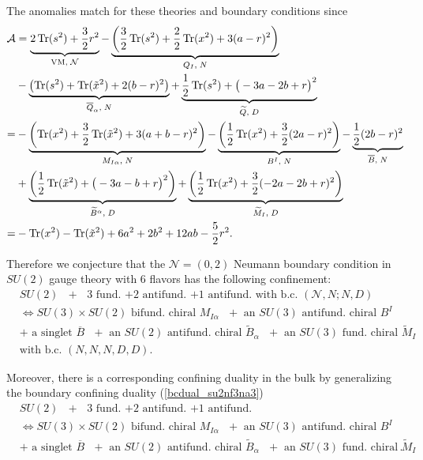 \documentclass[12pt]{article}
\newcommand{\Acal}{\mathcal{A}}
\newcommand{\Ncal}{\mathcal{N}}
\DeclareMathOperator*{\Tr}{{\rm Tr}}
\numberwithin{equation}{section}
\begin{document}
The anomalies match for these theories and boundary conditions since
\begin{align}
\label{bdy_SU2_3_3_anom}
\Acal & = \underbrace{2\Tr(s^2) + \frac{3}{2}r^2}_{\textrm{VM}, \; \Ncal}
 - \underbrace{\left( \frac{3}{2} \Tr(s^2) + \frac{2}{2} \Tr(x^2) + 3(a-r)^2 \right)}_{Q_I, \; N}
  \nonumber \\
 & - \underbrace{\left( \Tr(s^2) + \Tr(\tilde{x}^2) + 2(b-r)^2 \right)}_{\overline{Q}_{\alpha}, \; N}
 + \underbrace{\frac{1}{2} \Tr(s^2) + \big( -3a-2b+r \big)^2}_{\widetilde{Q}, \; D}
  \nonumber \\
  = & - \underbrace{\left( \Tr(x^2) + \frac{3}{2} \Tr(\tilde{x}^2) + 3(a+b-r)^2 \right)}_{M_{I \alpha}, \; N}
   - \underbrace{\left( \frac{1}{2} \Tr(x^2) + \frac{3}{2}(2a-r)^2 \right)}_{B^I, \; N}
   - \underbrace{\frac{1}{2}(2b-r)^2}_{\overline{B}, \; N}
   \nonumber \\
 & + \underbrace{\left( \frac{1}{2} \Tr(\tilde{x}^2) + \big( -3a-b+r \big)^2 \right)}_{\widetilde{B}^{\alpha}, \; D}
 + \underbrace{\left( \frac{1}{2} \Tr(x^2) + \frac{3}{2}(-2a-2b+r)^2 \right)}_{\widetilde{M}_I, \; D}
  \nonumber \\
  = & - \Tr(x^2) - \Tr(\tilde{x}^2) + 6a^2 + 2b^2 + 12ab - \frac{5}{2}r^2. 
\end{align}

Therefore we conjecture that the $\mathcal{N}=(0,2)$ Neumann boundary condition  
in $SU(2)$ gauge theory with 6 flavors has the following confinement: 
\begin{align}
\label{bcdual_su2nf3na3}
&\textrm{$SU(2)$ $+$ $3$ fund. $+2$ antifund. $+1$ antifund. with b.c. $(\mathcal{N},N;N,D)$}
\nonumber\\
&\Leftrightarrow 
\textrm{
$SU(3)\times SU(2)$ bifund. chiral $M_{I\alpha}$ $+$ an $SU(3)$ antifund. chiral $B^I$}
\nonumber\\
&
\textrm{$+$ a singlet $\overline{B}$ 
$+$ an $SU(2)$ antifund. chiral $\widetilde{B}_{\alpha}$ 
$+$ an $SU(3)$ fund. chiral $\widetilde{M}_I$ 
}
\nonumber\\
&\textrm{
with b.c. $(N,N,N,D,D)$}. 
\end{align}

Moreover, there is a corresponding confining duality in the bulk by generalizing the boundary confining duality (\ref{bcdual_su2nf3na3})
\begin{align}
\label{dual_su2nf3na3}
&\textrm{$SU(2)$ $+$ $3$ fund. $+2$ antifund. $+1$ antifund. }
\nonumber\\
&\Leftrightarrow 
\textrm{
$SU(3)\times SU(2)$ bifund. chiral $M_{I\alpha}$ $+$ an $SU(3)$ antifund. chiral $B^I$}
\nonumber\\
&
\textrm{$+$ a singlet $\overline{B}$ 
$+$ an $SU(2)$ antifund. chiral $\widetilde{B}_{\alpha}$ 
$+$ an $SU(3)$ fund. chiral $\widetilde{M}_I$ 
}.
\end{align}
\end{document}
